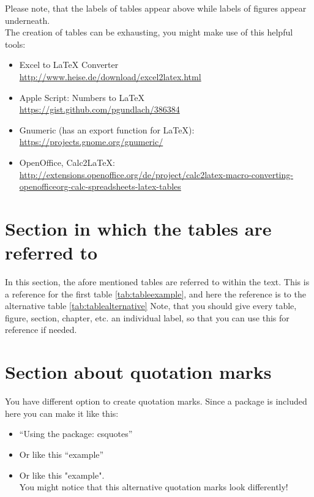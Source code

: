 Please note, that the labels of tables appear above while labels of figures appear underneath. \\

The creation of tables can be exhausting, you might make use of this helpful tools:
\begin{itemize}
	\item Excel to \LaTeX{} Converter\\ \url{http://www.heise.de/download/excel2latex.html}
	\item Apple Script: Numbers to \LaTeX{} \\ \url{https://gist.github.com/pgundlach/386384}
	\item Gnumeric (has an export function for \LaTeX{}): \\ \url{https://projects.gnome.org/gnumeric/}
	\item OpenOffice, Calc2LaTeX: \url{http://extensions.openoffice.org/de/project/calc2latex-macro-converting-openofficeorg-calc-spreadsheets-latex-tables}
\end{itemize}



\section{Section in which the tables are referred to} %
\label{sec:section_in_which_the_tables_are_referred_to}

In this section, the afore mentioned tables are referred to within the text. This is a reference for the first table \ref{tab:tableexample}, and here the reference is to the alternative table \ref{tab:tablealternative}
Note, that you should give every table, figure, section, chapter, etc. an individual label, so that you can use this for reference if needed.



\section{Section about quotation marks} %
\label{sec:section_about_quotation_marks}


You have different option to create quotation marks. Since a package is included here you can make it like this:
\begin{itemize}
	\item \enquote{Using the package: csquotes}
	\item Or like this ``example''
	\item Or like this "example". \\ You might notice that this alternative quotation marks look differently!
\end{itemize}





